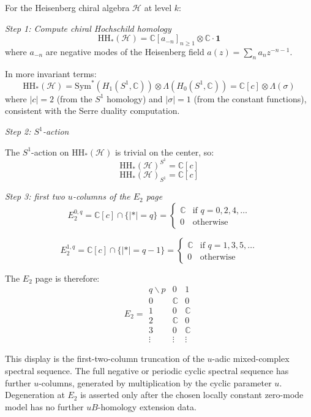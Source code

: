 \begin{example}
\label{ex:E2-heisenberg}
For the Heisenberg chiral algebra $\mathcal{H}$ at level $k$:

\emph{Step 1: Compute chiral Hochschild homology}
\[\text{HH}_*(\mathcal{H}) = \mathbb{C}[a_{-n}]_{n \geq 1} \otimes \mathbb{C} \cdot \mathbf{1}\]
where $a_{-n}$ are negative modes of the Heisenberg field $a(z) = \sum_n a_n z^{-n-1}$.

In more invariant terms:
\[\text{HH}_*(\mathcal{H}) = \text{Sym}^*(H_1(S^1, \mathbb{C})) \otimes \Lambda(H_0(S^1, \mathbb{C})) = \mathbb{C}[c] \otimes \Lambda(\sigma)\]
where $|c| = 2$ (from the $S^1$ homology) and $|\sigma| = 1$ (from the constant functions), consistent with the Serre duality computation.

\emph{Step 2: $S^1$-action}

The $S^1$-action on $\text{HH}_*(\mathcal{H})$ is trivial on the center, so:
\[\text{HH}_*(\mathcal{H})^{S^1} = \mathbb{C}[c]\]
\[\text{HH}_*(\mathcal{H})_{S^1} = \mathbb{C}[c]\]

\emph{Step 3: first two $u$-columns of the $E_2$ page}
\[E_2^{0,q} = \mathbb{C}[c] \cap \{|*| = q\} = \begin{cases}
\mathbb{C} & \text{if } q = 0, 2, 4, \ldots \\
0 & \text{otherwise}
\end{cases}\]

\[E_2^{1,q} = \mathbb{C}[c] \cap \{|*| = q-1\} = \begin{cases}
\mathbb{C} & \text{if } q = 1, 3, 5, \ldots \\
0 & \text{otherwise}
\end{cases}\]

The $E_2$ page is therefore:
\[E_2 = \begin{array}{c|cc}
q \backslash p & 0 & 1 \\
\hline
0 & \mathbb{C} & 0 \\
1 & 0 & \mathbb{C} \\
2 & \mathbb{C} & 0 \\
3 & 0 & \mathbb{C} \\
\vdots & \vdots & \vdots
\end{array}\]

This display is the first-two-column truncation of the $u$-adic
mixed-complex spectral sequence. The full negative or periodic cyclic
spectral sequence has further $u$-columns, generated by multiplication
by the cyclic parameter $u$. Degeneration at $E_2$ is asserted only
after the chosen
locally constant zero-mode model has no further $uB$-homology
extension data.


\end{example}
